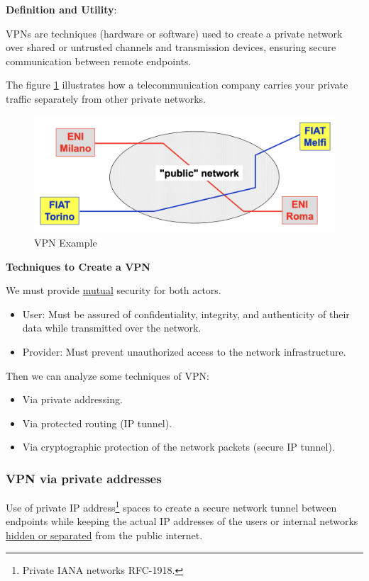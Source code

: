 \textbf{Definition and Utility}:

VPNs are techniques (hardware or software) used to create a private network over shared or untrusted channels and transmission devices, ensuring secure communication between remote endpoints.

The figure \ref{fig:vpn_definition} illustrates how a telecommunication company carries your private traffic separately from other private networks.

\begin{figure}[H]
    \includegraphics[width=350pt]{Images/NetSec/vpn_definition.png}
    \caption{VPN Example}
    \label{fig:vpn_definition}
    
\end{figure}

\textbf{Techniques to Create a VPN}

We must provide \underline{mutual} security for both actors.
\begin{itemize}
    \item User: Must be assured of confidentiality, integrity, and authenticity of their data while transmitted over the network.
    \item Provider: Must prevent unauthorized access to the network infrastructure.
\end{itemize}

Then we can analyze some techniques of VPN:
\begin{itemize}
    \item Via private addressing.
    \item Via protected routing (IP tunnel).
    \item Via cryptographic protection of the network packets (secure IP tunnel).
\end{itemize}
\hfill
\begin{center}
    \subsubsection{VPN via private addresses}
\end{center}
Use of private IP address\footnote{Private IANA networks RFC-1918.} spaces to create a secure network tunnel between endpoints while keeping the actual IP addresses of the users or internal networks \underline{hidden or separated} from the public internet.


